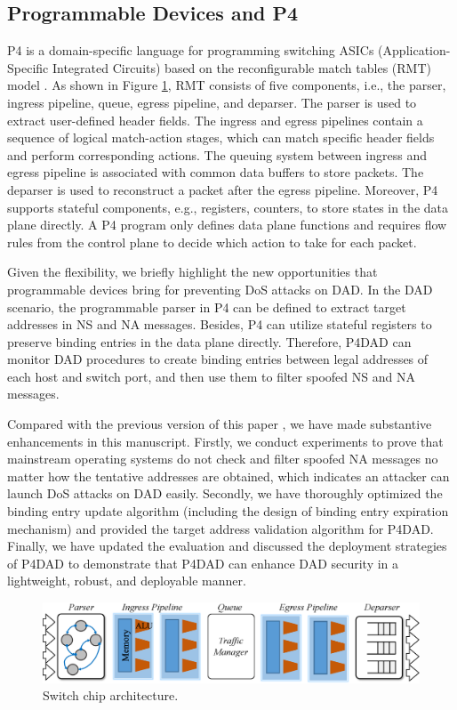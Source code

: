\documentclass[a4paper,fleqn]{cas-dc}
\begin{document}
    \subsection{Programmable Devices and P4}
        P4 \cite{P4} is a domain-specific language for programming switching ASICs (Application-Specific Integrated Circuits) based on the reconfigurable match tables (RMT) model \cite{RMT}.
        As shown in Figure \ref{fig:P4Switch}, RMT consists of five components, i.e., the parser, ingress pipeline, queue, egress pipeline, and deparser.
        The parser is used to extract user-defined header fields.
        The ingress and egress pipelines contain a sequence of logical match-action stages, which can match specific header fields and perform corresponding actions. The queuing system between ingress and egress pipeline is associated with common data buffers to store packets. The deparser is used to reconstruct a packet after the egress pipeline.
        Moreover, P4 supports stateful components, e.g., registers, counters, to store states in the data plane directly.
        A P4 program only defines data plane functions and requires flow rules from the control plane to decide which action to take for each packet.
        
        Given the flexibility, we briefly highlight the new opportunities that programmable devices bring for preventing DoS attacks on DAD. In the DAD scenario, the programmable parser in P4 can be defined to extract target addresses in NS and NA messages. Besides, P4 can utilize stateful registers to preserve binding entries in the data plane directly. Therefore, P4DAD can monitor DAD procedures to create binding entries between legal addresses of each host and switch port, and then use them to filter spoofed NS and NA messages.
        
        Compared with the previous version of this paper \cite{DBLP:conf/icc/KuangLH20}, we have made substantive enhancements in this manuscript.
        Firstly, we conduct experiments to prove that mainstream operating systems do not check and filter spoofed NA messages no matter how the tentative addresses are obtained, which indicates an attacker can launch DoS attacks on DAD easily.
        Secondly, we have thoroughly optimized the binding entry update algorithm (including the design of binding entry expiration mechanism) and provided the target address validation algorithm for P4DAD.
        Finally, we have updated the evaluation and discussed the deployment strategies of P4DAD to demonstrate that P4DAD can enhance DAD security in a lightweight, robust, and deployable manner.
        \begin{figure}
                \centerline{
                    \includegraphics[scale=0.3]{figure/RMT.eps}
                }
                \caption{Switch chip architecture.}
                \label{fig:P4Switch}
        \end{figure} 
\end{document}
